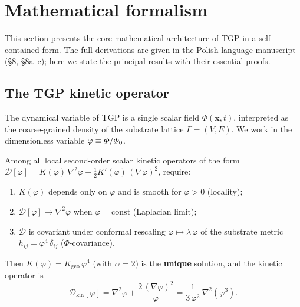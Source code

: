
\section{Mathematical formalism}\label{sec:formalism}

This section presents the core mathematical architecture of TGP
in a self-contained form.  The full derivations are given in the
Polish-language manuscript (\S8, \S8a--c); here we state the
principal results with their essential proofs.

\subsection{The TGP kinetic operator}\label{ssec:kinetic-operator}

The dynamical variable of TGP is a single scalar field
$\Phi(\mathbf{x},t)$, interpreted as the coarse-grained
density of the substrate lattice $\Gamma=(V,E)$.
We work in the dimensionless variable $\varphi \equiv \varPhi/\varPhi_0$.

\begin{theorem}%
\label{thm:D-uniqueness-en}
Among all local second-order scalar kinetic operators of the form
$\mathcal{D}[\varphi] = K(\varphi)\,\nabla^{2}\varphi
 + \tfrac{1}{2}K'(\varphi)\,(\nabla\varphi)^{2}$,
require:
\begin{enumerate}[(C1)]
  \item $K(\varphi)$ depends only on $\varphi$ and is smooth for
        $\varphi > 0$\; (locality);
  \item $\mathcal{D}[\varphi]\to\nabla^{2}\varphi$ when
        $\varphi = \mathrm{const}$\; (Laplacian limit);
  \item $\mathcal{D}$ is covariant under conformal rescaling
        $\varphi \mapsto \lambda\,\varphi$ of the substrate metric
        $h_{ij}=\varphi^{4}\,\delta_{ij}$\;
        ($\Phi$-covariance).
\end{enumerate}
Then $K(\varphi)=K_{\mathrm{geo}}\,\varphi^{4}$ (with $\alpha=2$)
is the \textbf{unique} solution, and the kinetic operator is
\begin{equation}\label{eq:Dkin}
  \boxed{
    \mathcal{D}_{\mathrm{kin}}[\varphi]
    = \nabla^{2}\varphi + \frac{2\,(\nabla\varphi)^{2}}{\varphi}
    = \frac{1}{3\,\varphi^{2}}\,\nabla^{2}(\varphi^{3}).
  }
\end{equation}
\end{theorem}

